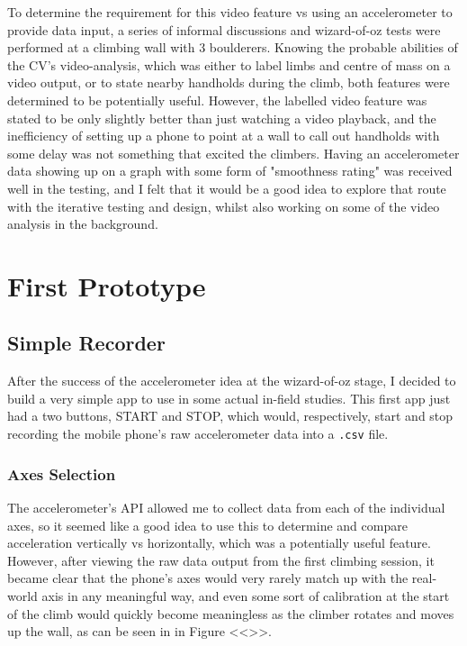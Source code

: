 To determine the requirement for this video feature vs using an accelerometer to provide data input, a series of informal discussions and wizard-of-oz tests were performed at a climbing wall with 3 boulderers.
Knowing the probable abilities of the CV's video-analysis, which was either to label limbs and centre of mass on a video output, or to state nearby handholds during the climb, both features were determined to be potentially useful.
However, the labelled video feature was stated to be only slightly better than just watching a video playback, and the inefficiency of setting up a phone to point at a wall to call out handholds with some delay was not something that excited the climbers.
Having an accelerometer data showing up on a graph with some form of "smoothness rating" was received well in the testing, and I felt that it would be a good idea to explore that route with the iterative testing and design, whilst also working on some of the video analysis in the background.


\section{First Prototype}

\subsection{Simple Recorder}
After the success of the accelerometer idea at the wizard-of-oz stage, I decided to build a very simple app to use in some actual in-field studies.
This first app just had a two buttons, START and STOP, which would, respectively, start and stop recording the mobile phone's raw accelerometer data into a \verb|.csv| file.

\subsubsection{Axes Selection}
The accelerometer's API allowed me to collect data from each of the individual axes, so it seemed like a good idea to use this to determine and compare acceleration vertically vs horizontally, which was a potentially useful feature.
However, after viewing the raw data output from the first climbing session, it became clear that the phone's axes would very rarely match up with the real-world axis in any meaningful way, and even some sort of calibration at the start of the climb would quickly become meaningless as the climber rotates and moves up the wall, as can be seen in in Figure <<>>.

